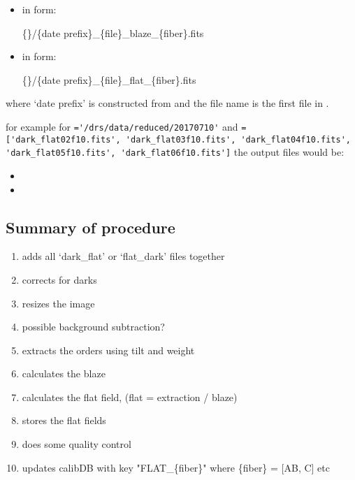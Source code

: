 \begin{itemize}

\item {} in form:
\begin{tcustomdir}
\{\reduceddir\}/\{date prefix\}\_\{file\}\_blaze\_\{fiber\}.fits
\end{tcustomdir}

\item {} in form:
\begin{tcustomdir}
\{\reduceddir\}/\{date prefix\}\_\{file\}\_flat\_\{fiber\}.fits
\end{tcustomdir}

\end{itemize}


\noindent where `date prefix' is constructed from \argnightname and the file name is the first file in \argfilenames.


\noindent for example for \reduceddir\lstinline[style=pythoninline]|='/drs/data/reduced/20170710'| and \argfilenames\lstinline[style=pythoninline]|=['dark_flat02f10.fits', 'dark_flat03f10.fits', 'dark_flat04f10.fits', 'dark_flat05f10.fits', 'dark_flat06f10.fits']| the output files would be:
\begin{tcustomdir}
\begin{itemize}
\item {}
\item {}
\end{itemize}
\end{tcustomdir}

\subsection{Summary of procedure}
\begin{enumerate}
\item adds all `dark\_flat' or `flat\_dark' files together
\item corrects for darks
\item resizes the image
\item possible background subtraction?
\item extracts the orders using tilt and weight
\item calculates the blaze
\item calculates the flat field, (flat = extraction / blaze)
\item stores the flat fields
\item does some quality control
\item updates calibDB with key "FLAT\_\{fiber\}" where \{fiber\} = [AB, C] etc
\end{enumerate}

